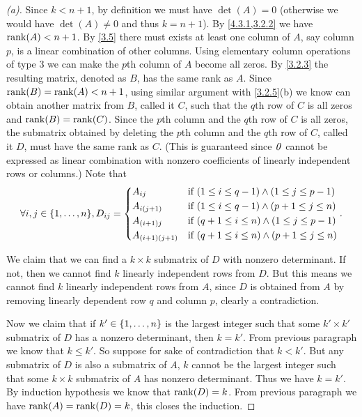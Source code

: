 \begin{proof}[(a)]
	Since \(k < n + 1\), by definition we must have \(\det(A) = 0\) (otherwise we would have \(\det(A) \neq 0\) and thus \(k = n + 1\)).
	By \cref{4.3.1,3.2.2} we have \(\rk{A} < n + 1\).
	By \cref{3.5} there must exists at least one column of \(A\), say column \(p\), is a linear combination of other columns.
	Using elementary column operations of type 3 we can make the \(p\)th column of \(A\) become all zeros.
	By \cref{3.2.3} the resulting matrix, denoted as \(B\), has the same rank as \(A\).
	Since \(\rk{B} = \rk{A} < n + 1\), using similar argument with \cref{3.2.5}(b) we know can obtain another matrix from \(B\), called it \(C\), such that the \(q\)th row of \(C\) is all zeros and \(\rk{B} = \rk{C}\).
	Since the \(p\)th column and the \(q\)th row of \(C\) is all zeros, the submatrix obtained by deleting the \(p\)th column and the \(q\)th row of \(C\), called it \(D\), must have the same rank as \(C\).
	(This is guaranteed since \(\mathit{0}\) cannot be expressed as linear combination with nonzero coefficients of linearly independent rows or columns.)
	Note that
	\[
		\forall i, j \in \set{1, \dots, n}, D_{i j} = \begin{dcases}
			A_{i j}             & \text{if } (1 \leq i \leq q - 1) \land (1 \leq j \leq p - 1) \\
			A_{i (j + 1)}       & \text{if } (1 \leq i \leq q - 1) \land (p + 1 \leq j \leq n) \\
			A_{(i + 1) j}       & \text{if } (q + 1 \leq i \leq n) \land (1 \leq j \leq p - 1) \\
			A_{(i + 1) (j + 1)} & \text{if } (q + 1 \leq i \leq n) \land (p + 1 \leq j \leq n)
		\end{dcases}.
	\]

	We claim that we can find a \(k \times k\) submatrix of \(D\) with nonzero determinant.
	If not, then we cannot find \(k\) linearly independent rows from \(D\).
	But this means we cannot find \(k\) linearly independent rows from \(A\), since \(D\) is obtained from \(A\) by removing linearly dependent row \(q\) and column \(p\), clearly a contradiction.

	Now we claim that if \(k' \in \left\lbrace1, \dots, n\right\rbrace\) is the largest integer such that some \(k' \times k'\) submatrix of \(D\) has a nonzero determinant, then \(k = k'\).
	From previous paragraph we know that \(k \leq k'\).
	So suppose for sake of contradiction that \(k < k'\).
	But any submatrix of \(D\) is also a submatrix of \(A\), \(k\) cannot be the largest integer such that some \(k \times k\) submatrix of \(A\) has nonzero determinant.
	Thus we have \(k = k'\).
	By induction hypothesis we know that \(\rk{D} = k\).
	From previous paragraph we have \(\rk{A} = \rk{D} = k\), this closes the induction.
\end{proof}

